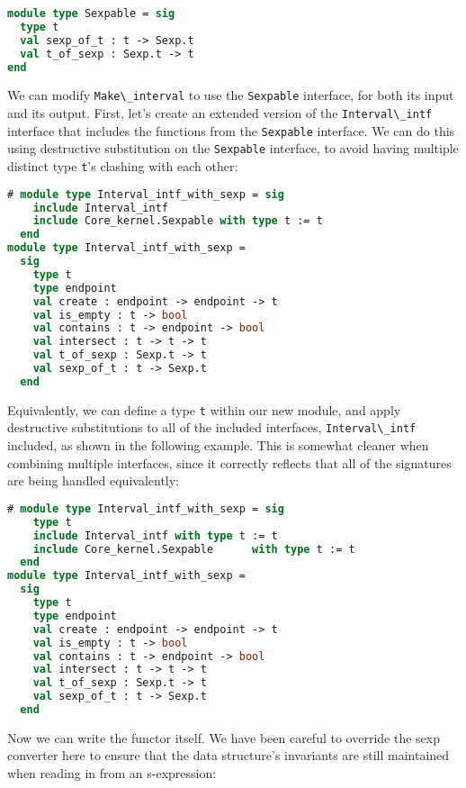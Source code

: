 \begin{lstlisting}[language=Caml]
module type Sexpable = sig
  type t
  val sexp_of_t : t -> Sexp.t
  val t_of_sexp : Sexp.t -> t
end
\end{lstlisting}

We can modify \passthrough{\lstinline!Make\_interval!} to use the
\passthrough{\lstinline!Sexpable!} interface, for both its input and its
output. First, let's create an extended version of the
\passthrough{\lstinline!Interval\_intf!} interface that includes the
functions from the \passthrough{\lstinline!Sexpable!} interface. We can
do this using destructive substitution on the
\passthrough{\lstinline!Sexpable!} interface, to avoid having multiple
distinct type \passthrough{\lstinline!t!}'s clashing with each other:

\begin{lstlisting}[language=Caml]
# module type Interval_intf_with_sexp = sig
    include Interval_intf
    include Core_kernel.Sexpable with type t := t
  end
module type Interval_intf_with_sexp =
  sig
    type t
    type endpoint
    val create : endpoint -> endpoint -> t
    val is_empty : t -> bool
    val contains : t -> endpoint -> bool
    val intersect : t -> t -> t
    val t_of_sexp : Sexp.t -> t
    val sexp_of_t : t -> Sexp.t
  end
\end{lstlisting}

Equivalently, we can define a type \passthrough{\lstinline!t!} within
our new module, and apply destructive substitutions to all of the
included interfaces, \passthrough{\lstinline!Interval\_intf!} included,
as shown in the following example. This is somewhat cleaner when
combining multiple interfaces, since it correctly reflects that all of
the signatures are being handled equivalently:

\begin{lstlisting}[language=Caml]
# module type Interval_intf_with_sexp = sig
    type t
    include Interval_intf with type t := t
    include Core_kernel.Sexpable      with type t := t
  end
module type Interval_intf_with_sexp =
  sig
    type t
    type endpoint
    val create : endpoint -> endpoint -> t
    val is_empty : t -> bool
    val contains : t -> endpoint -> bool
    val intersect : t -> t -> t
    val t_of_sexp : Sexp.t -> t
    val sexp_of_t : t -> Sexp.t
  end
\end{lstlisting}

Now we can write the functor itself. We have been careful to override
the sexp converter here to ensure that the data structure's invariants
are still maintained when reading in from an s-expression:

